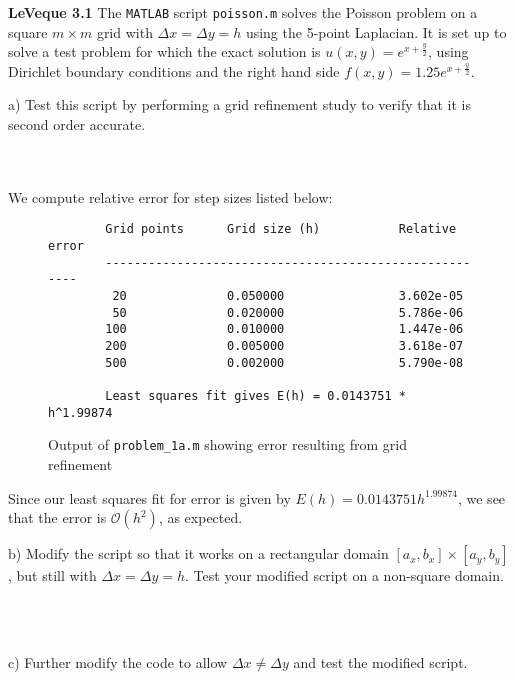 \textbf{LeVeque 3.1} The \texttt{MATLAB} script \texttt{poisson.m} solves the Poisson problem on a square $m \times m$ 
grid with $\Delta x = \Delta y = h $ using the 5-point Laplacian. It is set up to solve a test problem for which the 
exact solution is $u(x, y) = e^{x + \frac{y}{2}}$, using Dirichlet boundary conditions and the right hand side 
$f(x, y) = 1.25 e^{x + \frac{y}{2}}$.

a) Test this script by performing a grid refinement study to verify that it is second order accurate.

\begin{solution}\ \\\\
    We compute relative error for step sizes listed below:

    \begin{figure}[h]
        \begin{lstlisting}
        Grid points      Grid size (h)           Relative error
        -------------------------------------------------------
         20              0.050000                3.602e-05 
         50              0.020000                5.786e-06 
        100              0.010000                1.447e-06 
        200              0.005000                3.618e-07 
        500              0.002000                5.790e-08 
         
        Least squares fit gives E(h) = 0.0143751 * h^1.99874
        \end{lstlisting}
        \caption{Output of \texttt{problem\_1a.m} showing error resulting from grid refinement}
    \end{figure}

    Since our least squares fit for error is given by $E(h) = 0.0143751 h^{1.99874}$, we see that the error is 
    $\mathcal{O}(h^2)$, as expected.

\end{solution}

\pagebreak
b) Modify the script so that it works on a rectangular domain $[a_x, b_x] \times [a_y, b_y]$, but still with
   $\Delta x = \Delta y = h$. Test your modified script on a non-square domain.

\begin{solution}\ \\\\
\end{solution}

\pagebreak
c) Further modify the code to allow $\Delta x \neq \Delta y$ and test the modified script.

\begin{solution}\ \\\\
\end{solution}